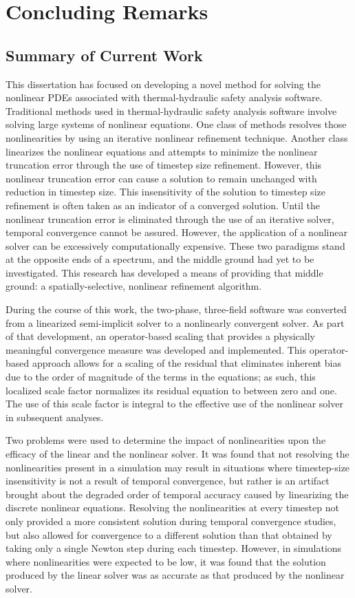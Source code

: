 \chapter{Concluding Remarks}
\label{chap:end}

\section{Summary of Current Work}
\label{section:summary}
This dissertation has focused on developing a novel method for solving the nonlinear PDEs associated with thermal-hydraulic safety analysis software.
Traditional methods used in thermal-hydraulic safety analysis software involve solving large systems of nonlinear equations.
One class of methods resolves those nonlinearities by using an iterative nonlinear refinement technique.
Another class linearizes the nonlinear equations and attempts to minimize the nonlinear truncation error through the use of timestep size refinement.
However, this nonlinear truncation error can cause a solution to remain unchanged with reduction in timestep size.
This insensitivity of the solution to timestep size refinement is often taken as an indicator of a converged solution. 
Until the nonlinear truncation error is eliminated through the use of an iterative solver, temporal convergence cannot be assured.
However, the application of a nonlinear solver can be excessively computationally expensive.
These two paradigms stand at the opposite ends of a spectrum, and the middle ground had yet to be investigated.
This research has developed a means of providing that middle ground: a spatially-selective, nonlinear refinement algorithm.

During the course of this work, the two-phase, three-field software \cobra{} was converted from a linearized semi-implicit solver to a nonlinearly convergent solver.
As part of that development, an operator-based scaling that provides a physically meaningful convergence measure was developed and implemented.
This operator-based approach allows for a scaling of the residual that eliminates inherent bias due to the order of magnitude of the terms in the equations; as such, this localized scale factor normalizes its residual equation to between zero and one.
The use of this scale factor is integral to the effective use of the nonlinear solver in  subsequent analyses.

Two problems were used to determine the impact of nonlinearities upon the efficacy of the linear and the nonlinear solver.
It was found that not resolving the nonlinearities present in a simulation may result in situations where timestep-size insensitivity is not a result of temporal convergence, but rather is an artifact brought about the degraded order of temporal accuracy caused by linearizing the discrete nonlinear equations.
Resolving the nonlinearities at every timestep not only provided a more consistent solution during temporal convergence studies, but also allowed for convergence to a different solution than that obtained by taking only a single Newton step during each timestep.
However, in simulations where nonlinearities were expected to be low, it was found that the solution produced by the linear solver was as accurate as that produced by the nonlinear solver.

